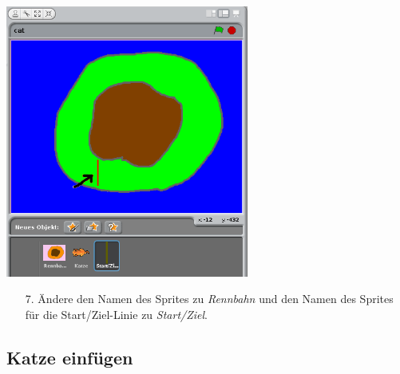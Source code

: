 \includegraphics[width=0.6\textwidth]{images/aufgabe4_rennbahn_malen_02.png}
\begin{itemize}
\item[7.] Ändere den Namen des Sprites zu \textit{Rennbahn} und den Namen des Sprites für die Start/Ziel-Linie zu \textit{Start/Ziel}.
\end{itemize}

\subsection{Katze einfügen}

